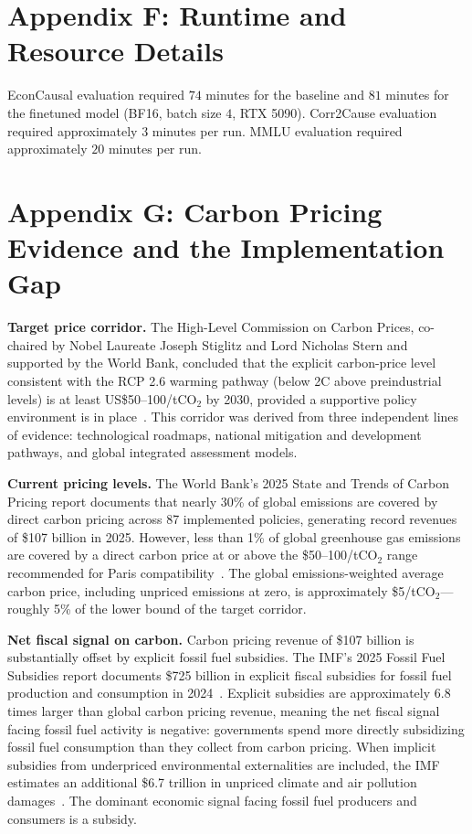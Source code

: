 \documentclass[11pt]{article}
\begin{document}
\section{Appendix F: Runtime and Resource Details}

EconCausal evaluation required $74$ minutes for the baseline and $81$ minutes for the finetuned model (BF16, batch size $4$, RTX 5090). Corr2Cause evaluation required approximately $3$ minutes per run. MMLU evaluation required approximately $20$ minutes per run.

\section{Appendix G: Carbon Pricing Evidence and the Implementation Gap}

\textbf{Target price corridor.} The High-Level Commission on Carbon Prices, co-chaired by Nobel Laureate Joseph Stiglitz and Lord Nicholas Stern and supported by the World Bank, concluded that the explicit carbon-price level consistent with the RCP 2.6 warming pathway (below 2C above preindustrial levels) is at least US\$50--100/tCO$_2$ by 2030, provided a supportive policy environment is in place~\cite{carbonpricingleadership2017}. This corridor was derived from three independent lines of evidence: technological roadmaps, national mitigation and development pathways, and global integrated assessment models.

\textbf{Current pricing levels.} The World Bank's 2025 State and Trends of Carbon Pricing report documents that nearly 30\% of global emissions are covered by direct carbon pricing across 87 implemented policies, generating record revenues of \$107 billion in 2025. However, less than 1\% of global greenhouse gas emissions are covered by a direct carbon price at or above the \$50--100/tCO$_2$ range recommended for Paris compatibility~\cite{worldbank2024statetrends}. The global emissions-weighted average carbon price, including unpriced emissions at zero, is approximately \$5/tCO$_2$---roughly 5\% of the lower bound of the target corridor.

\textbf{Net fiscal signal on carbon.} Carbon pricing revenue of \$107 billion is substantially offset by explicit fossil fuel subsidies. The IMF's 2025 Fossil Fuel Subsidies report documents \$725 billion in explicit fiscal subsidies for fossil fuel production and consumption in 2024~\cite{imf2025fossilfuelsubsidies}. Explicit subsidies are approximately 6.8 times larger than global carbon pricing revenue, meaning the net fiscal signal facing fossil fuel activity is negative: governments spend more directly subsidizing fossil fuel consumption than they collect from carbon pricing. When implicit subsidies from underpriced environmental externalities are included, the IMF estimates an additional \$6.7 trillion in unpriced climate and air pollution damages~\cite{imf2025fossilfuelsubsidies}. The dominant economic signal facing fossil fuel producers and consumers is a subsidy.
\end{document}
